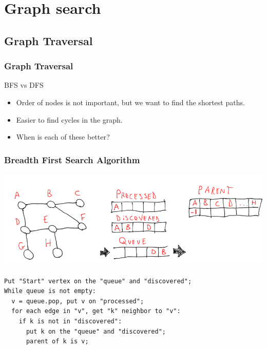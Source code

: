 \documentclass{beamer}
\begin{document}
\section{Graph search}
\subsection{Graph Traversal}
\begin{frame}
  \frametitle{Graph Traversal}
  
  \begin{block}{BFS vs DFS}
    \begin{itemize}
    \item {} Order of nodes is not
      important, but we want to find the shortest paths.
    \item {} Easier to find cycles in
      the graph.
    \item When is each of these better?
    \end{itemize}
  \end{block}
\end{frame}

\begin{frame}
  \frametitle{Breadth First Search Algorithm}
  \begin{center}
    \includegraphics[height=0.4\textheight]{bfs}
  \end{center}
  \begin{block}{}
    {\small
\begin{verbatim}
Put "Start" vertex on the "queue" and "discovered";
While queue is not empty:
  v = queue.pop, put v on "processed";
  for each edge in "v", get "k" neighbor to "v":
    if k is not in "discovered":
      put k on the "queue" and "discovered";
      parent of k is v;
\end{verbatim}
    }
  \end{block}
\end{frame}
\end{document}
